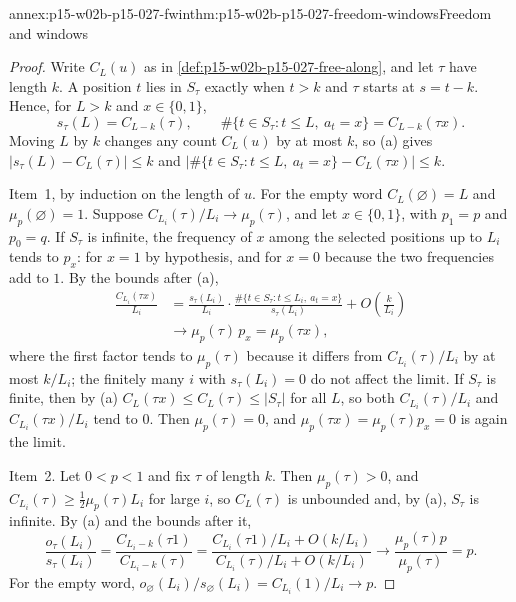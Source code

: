 \begin{annexitem}{annex:p15-w02b-p15-027-fwin}{thm:p15-w02b-p15-027-freedom-windows}{Freedom and windows}
\begin{proof}
Write \(C_L(u)\) as in \cref{def:p15-w02b-p15-027-free-along}, and let
\(\tau\) have length \(k\). A position \(t\) lies in \(S_\tau\) exactly
when \(t>k\) and \(\tau\) starts at \(s=t-k\). Hence, for \(L>k\) and
\(x\in\{0,1\}\),
\[
 s_\tau(L)=C_{L-k}(\tau),\qquad
 \#\{t\in S_\tau:t\leq L,\ a_t=x\}=C_{L-k}(\tau x). \tag{a}
\]
Moving \(L\) by \(k\) changes any count \(C_L(u)\) by at most \(k\), so
(a) gives \(|s_\tau(L)-C_L(\tau)|\leq k\) and
\(|\#\{t\in S_\tau:t\leq L,\ a_t=x\}-C_L(\tau x)|\leq k\).

Item~1, by induction on the length of \(u\). For the empty word
\(C_L(\varnothing)=L\) and \(\mu_p(\varnothing)=1\). Suppose
\(C_{L_i}(\tau)/L_i\to\mu_p(\tau)\), and let \(x\in\{0,1\}\), with
\(p_1=p\) and \(p_0=q\). If \(S_\tau\) is infinite, the frequency of
\(x\) among the selected positions up to \(L_i\) tends to \(p_x\): for
\(x=1\) by hypothesis, and for \(x=0\) because the two frequencies add
to \(1\). By the bounds after (a),
\[
\begin{aligned}
 \frac{C_{L_i}(\tau x)}{L_i}
 &=\frac{s_\tau(L_i)}{L_i}\cdot
  \frac{\#\{t\in S_\tau:t\leq L_i,\ a_t=x\}}{s_\tau(L_i)}+O\!\left(\frac{k}{L_i}\right)\\
 &\longrightarrow\mu_p(\tau)\,p_x=\mu_p(\tau x),
\end{aligned}
\]
where the first factor tends to \(\mu_p(\tau)\) because it differs from
\(C_{L_i}(\tau)/L_i\) by at most \(k/L_i\); the finitely many \(i\) with
\(s_\tau(L_i)=0\) do not affect the limit. If \(S_\tau\) is finite, then
by (a) \(C_{L}(\tau x)\leq C_L(\tau)\leq|S_\tau|\) for all \(L\), so both
\(C_{L_i}(\tau)/L_i\) and \(C_{L_i}(\tau x)/L_i\) tend to \(0\). Then
\(\mu_p(\tau)=0\), and \(\mu_p(\tau x)=\mu_p(\tau)p_x=0\) is again the
limit.

Item~2. Let \(0<p<1\) and fix \(\tau\) of length \(k\). Then
\(\mu_p(\tau)>0\), and \(C_{L_i}(\tau)\geq\tfrac12\mu_p(\tau)L_i\) for
large \(i\), so \(C_L(\tau)\) is unbounded and, by (a), \(S_\tau\) is
infinite. By (a) and the bounds after it,
\[
 \frac{o_\tau(L_i)}{s_\tau(L_i)}
 =\frac{C_{L_i-k}(\tau1)}{C_{L_i-k}(\tau)}
 =\frac{C_{L_i}(\tau1)/L_i+O(k/L_i)}{C_{L_i}(\tau)/L_i+O(k/L_i)}
 \longrightarrow\frac{\mu_p(\tau)p}{\mu_p(\tau)}=p .
\]
For the empty word, \(o_\varnothing(L_i)/s_\varnothing(L_i)=C_{L_i}(1)/L_i\to p\).
\end{proof}
\end{annexitem}

